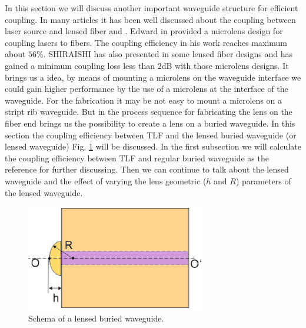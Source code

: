 In this section we will discuss another important waveguide structure for efficient coupling. In many articles it has been well discussed about the coupling between laser source and lensed fiber\cite{microlensese_to_fiber_coupling} and \cite{integrated_coupling _between_LD_SMF}.  Edward in \cite{microlensese_to_fiber_coupling} provided a microlens design for coupling lasers to fibers. The coupling efficiency in his work reaches maximum about $56\%$. SHIRAISHI has also presented in \cite{integrated_coupling _between_LD_SMF} some lensed fiber designs and has gained a minimum coupling loss less than $2$dB with those microlens designs. It brings us a idea, by means of mounting a microlens on the waveguide interface we could gain higher performance by the use of a microlens at the interface of the waveguide. For the fabrication it may be not easy to mount a microlens on a stript rib waveguide. But in \cite{lens_end_manufacture} the process sequence for fabricating the lens on the fiber end brings us the possibility to create a lens on a buried waveguide. In this section the coupling efficiency between TLF and the lensed buried waveguide (or lensed waveguide) Fig. \ref{fig:lensed_waveguide} will be discussed.
In the first subsection we will calculate the coupling efficiency between TLF and regular buried waveguide as the reference for further discussing. Then we can continue to talk about the lensed waveguide and the effect of varying the lens geometric ($h$ and $R$) parameters of the lensed waveguide. 
\begin{figure}[!ht]
\centering
\includegraphics[width=0.7\textwidth]{bilder/lensed_waveguide}
\caption{Schema of a lensed buried waveguide.}
\label{fig:lensed_waveguide}
\end{figure}
